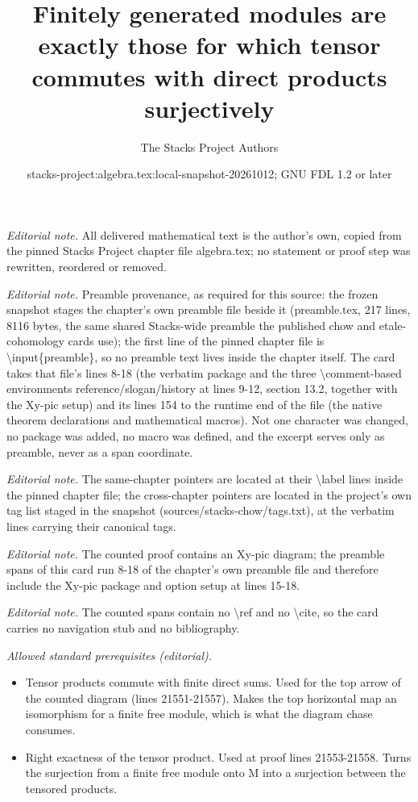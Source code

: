 \documentclass[10pt,a4paper]{amsart}
\title{Finitely generated modules are exactly those for which tensor commutes with direct products surjectively}
\author{The Stacks Project Authors}
\date{stacks-project:algebra.tex:local-snapshot-20261012; GNU FDL 1.2 or later}
\theoremstyle{plain}
\theoremstyle{definition}
\theoremstyle{remark}
\numberwithin{equation}{subsection}
\begin{document}
\maketitle
\noindent\textit{Editorial note.} All delivered mathematical text is the author's own, copied from the pinned Stacks Project chapter file algebra.tex; no statement or proof step was rewritten, reordered or removed.\par\medskip
\noindent\textit{Editorial note.} Preamble provenance, as required for this source: the frozen snapshot stages the chapter's own preamble file beside it (preamble.tex, 217 lines, 8116 bytes, the same shared Stacks-wide preamble the published chow and etale-cohomology cards use); the first line of the pinned chapter file is \textbackslash{}input\{preamble\}, so no preamble text lives inside the chapter itself. The card takes that file's lines 8-18 (the verbatim package and the three \textbackslash{}comment-based environments reference/slogan/history at lines 9-12, section 13.2, together with the Xy-pic setup) and its lines 154 to the runtime end of the file (the native theorem declarations and mathematical macros). Not one character was changed, no package was added, no macro was defined, and the excerpt serves only as preamble, never as a span coordinate.\par\medskip
\noindent\textit{Editorial note.} The same-chapter pointers are located at their \textbackslash{}label lines inside the pinned chapter file; the cross-chapter pointers are located in the project's own tag list staged in the snapshot (sources/stacks-chow/tags.txt), at the verbatim lines carrying their canonical tags.\par\medskip
\noindent\textit{Editorial note.} The counted proof contains an Xy-pic diagram; the preamble spans of this card run 8-18 of the chapter's own preamble file and therefore include the Xy-pic package and option setup at lines 15-18.\par\medskip
\noindent\textit{Editorial note.} The counted spans contain no \textbackslash{}ref and no \textbackslash{}cite, so the card carries no navigation stub and no bibliography.\par\medskip
\noindent\textit{Allowed standard prerequisites (editorial).}\begin{itemize}
\item Tensor products commute with finite direct sums. Used for the top arrow of the counted diagram (lines 21551-21557). Makes the top horizontal map an isomorphism for a finite free module, which is what the diagram chase consumes.
\item Right exactness of the tensor product. Used at proof lines 21553-21558. Turns the surjection from a finite free module onto M into a surjection between the tensored products.
\end{itemize}\medskip
\end{document}
